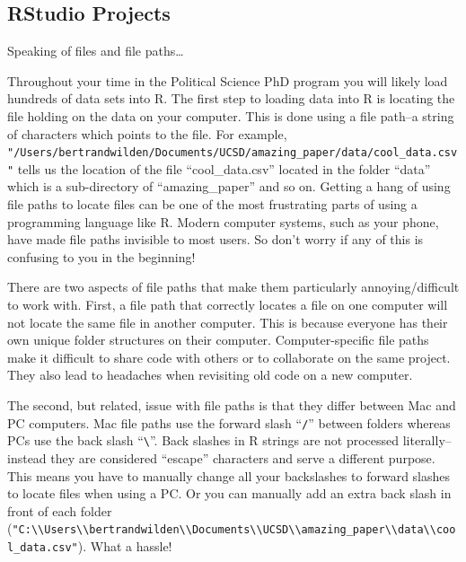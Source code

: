 \documentclass[
  letterpaper,
]{book}
\theoremstyle{definition}
\theoremstyle{definition}
\theoremstyle{plain}
\theoremstyle{definition}
\theoremstyle{plain}
\theoremstyle{plain}
\theoremstyle{remark}
\begin{document}
\hypertarget{rstudio-projects}{%
\subsection{RStudio Projects}\label{rstudio-projects}}

Speaking of files and file paths\ldots{}

Throughout your time in the Political Science PhD program you will
likely load hundreds of data sets into R. The first step to loading data
into R is locating the file holding on the data on your computer. This
is done using a file path--a string of characters which points to the
file. For example,
\texttt{"/Users/bertrandwilden/Documents/UCSD/amazing\_paper/data/cool\_data.csv"}
tells us the location of the file ``cool\_data.csv'' located in the
folder ``data'' which is a sub-directory of ``amazing\_paper'' and so
on. Getting a hang of using file paths to locate files can be one of the
most frustrating parts of using a programming language like R. Modern
computer systems, such as your phone, have made file paths invisible to
most users. So don't worry if any of this is confusing to you in the
beginning!

There are two aspects of file paths that make them particularly
annoying/difficult to work with. First, a file path that correctly
locates a file on one computer will not locate the same file in another
computer. This is because everyone has their own unique folder
structures on their computer. Computer-specific file paths make it
difficult to share code with others or to collaborate on the same
project. They also lead to headaches when revisiting old code on a new
computer.

The second, but related, issue with file paths is that they differ
between Mac and PC computers. Mac file paths use the forward slash
``\texttt{/}'' between folders whereas PCs use the back slash
``\texttt{\textbackslash{}}''. Back slashes in R strings are not
processed literally--instead they are considered ``escape'' characters
and serve a different purpose. This means you have to manually change
all your backslashes to forward slashes to locate files when using a PC.
Or you can manually add an extra back slash in front of each folder
(\texttt{"C:\textbackslash{}\textbackslash{}Users\textbackslash{}\textbackslash{}bertrandwilden\textbackslash{}\textbackslash{}Documents\textbackslash{}\textbackslash{}UCSD\textbackslash{}\textbackslash{}amazing\_paper\textbackslash{}\textbackslash{}data\textbackslash{}\textbackslash{}cool\_data.csv"}).
What a hassle!
\end{document}
